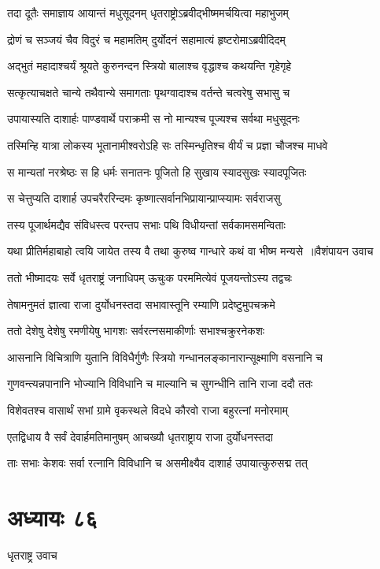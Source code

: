 \twolineshloka
{तदा दूतैः समाज्ञाय आयान्तं मधुसूदनम्}
{धृतराष्ट्रोऽब्रवीद्भीष्ममर्चयित्वा महाभुजम्}


\twolineshloka
{द्रोणं च सञ्जयं चैव विदुरं च महामतिम्}
{दुर्योदनं सहामात्यं हृष्टरोमाऽब्रवीदिदम्}


\twolineshloka
{अद्भुतं महादाश्चर्यं श्रूयते कुरुनन्दन}
{स्त्रियो बालाश्च वृद्धाश्च कथयन्ति गृहेगृहे}


\twolineshloka
{सत्कृत्याचक्षते चान्ये तथैवान्ये समागताः}
{पृथग्वादाश्च वर्तन्ते चत्वरेषु सभासु च}


\twolineshloka
{उपायास्यति दाशार्हः पाण्डवार्थे पराक्रमी}
{स नो मान्यश्च पूज्यश्च सर्वथा मधुसूदनः}


\twolineshloka
{तस्मिन्हि यात्रा लोकस्य भूतानामीश्वरोऽहि सः}
{तस्मिन्धृतिश्च वीर्यं च प्रज्ञा चौजश्च माधवे}


\twolineshloka
{स मान्यतां नरश्रेष्ठः स हि धर्मः सनातनः}
{पूजितो हि सुखाय स्यादसुखः स्यादपूजितः}


\twolineshloka
{स चेत्तुप्यति दाशार्ह उपचरैररिन्दमः}
{कृष्णात्सर्वानभिप्रायान्प्राप्स्यामः सर्वराजसु}


\twolineshloka
{तस्य पूजार्थमद्यैव संविधस्त्व परन्तप}
{सभाः पथि विधीयन्तां सर्वकामसमन्विताः}


\threelineshloka
{यथा प्रीतिर्महाबाहो त्वयि जायेत तस्य वै}
{तथा कुरुष्व गान्धारे कथं वा भीष्म मन्यसे ॥वैशंपायन उवाच}
{}


\twolineshloka
{ततो भीष्मादयः सर्वे धृतराष्ट्रं जनाधिपम्}
{ऊचुःक परममित्येवं पूजयन्तोऽस्य तद्वचः}


\twolineshloka
{तेषामनुमतं ज्ञात्वा राजा दुर्योधनस्तदा}
{सभावास्तूनि रम्याणि प्रदेष्टुमुपचक्रमे}


\twolineshloka
{ततो देशेषु देशेषु रमणीयेषु भागशः}
{सर्वरत्नसमाकीर्णाः सभाश्चक्रुरनेकशः}


\twolineshloka
{आसनानि विचित्राणि युतानि विविधैर्गुणैः}
{स्त्रियो गन्धानलङ्कानारान्सूक्ष्माणि वसनानि च}


\twolineshloka
{गुणवन्त्यन्नपानानि भोज्यानि विविधानि च}
{माल्यानि च सुगन्धीनि तानि राजा ददौ ततः}


\twolineshloka
{विशेवतश्च वासार्थं सभां ग्रामे वृकस्थले}
{विदधे कौरवो राजा बहुरत्नां मनोरमाम्}


\twolineshloka
{एतद्विधाय वै सर्वं देवार्हमतिमानुषम्}
{आचख्यौ धृतराष्ट्राय राजा दुर्योधनस्तदा}


\twolineshloka
{ताः सभाः केशवः सर्वा रत्नानि विविधानि च}
{असमीक्ष्यैव दाशार्ह उपायात्कुरुसद्म तत्}


\chapter{अध्यायः ८६}
\twolineshloka
{धृतराष्ट्र उवाच}
{}


